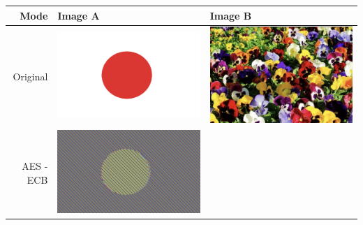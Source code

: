 \documentclass[fleqn, journal, onecolumn]{IEEEtran}             %
\theoremstyle{break}                                            %
\begin{document}
    \begin{tabular}{|r || p{5cm} | p{5cm} | }
      \hline
      Mode & Image A & Image B  \\ [0.5ex] 
      \hline\hline
     
        Original  &  
        \begin{minipage}{.2\textwidth}
          \includegraphics[width=\linewidth]{japan}
        \end{minipage}  & 
        \begin{minipage}{.2\textwidth}
          \includegraphics[width=\linewidth]{flores}
        \end{minipage}    
        \\\hline
        AES - ECB  &  
        \begin{minipage}{.2\textwidth}
          \includegraphics[width=\linewidth]{1AES1}

\end{minipage}
\end{tabular}
\end{document}

